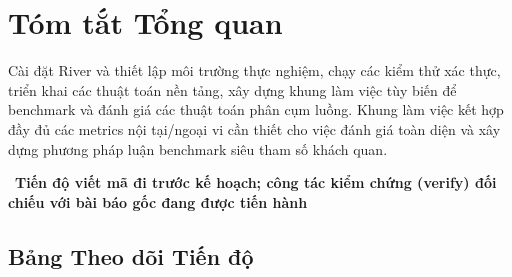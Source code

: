 \section{Tóm tắt Tổng quan}
\begin{description}[font=\bfseries\color{accentdark},style=sameline,leftmargin=0pt,labelindent=0pt,itemindent=0pt,labelwidth=0pt,labelsep=0.4em,
                    itemsep=4pt,topsep=2pt]
  \item[Mục tiêu -] Cài đặt River và thiết lập môi trường thực nghiệm, chạy các kiểm thử xác thực, triển khai các thuật toán nền tảng, xây dựng khung làm việc tùy biến để benchmark và đánh giá các thuật toán phân cụm luồng. Khung làm việc kết hợp đầy đủ các metrics nội tại/ngoại vi cần thiết cho việc đánh giá toàn diện và xây dựng phương pháp luận benchmark siêu tham số khách quan.
  \item[Trạng thái -] \WIP\ \textbf{Tiến độ viết mã đi trước kế hoạch; công tác kiểm chứng (verify) đối chiếu với bài báo gốc đang được tiến hành}
\end{description}

\subsection*{Bảng Theo dõi Tiến độ}

